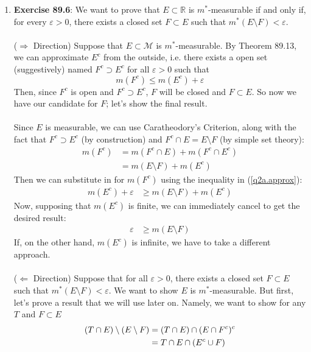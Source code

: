\documentclass[12pt]{article}
\theoremstyle{plain}
\theoremstyle{definition}
\theoremstyle{remark}
\begin{document}
\begin{enumerate}
\begin{enumerate}
\item \textbf{Exercise 89.6}: We want to prove that $E\subset \mathbb{R}$ is $m^*$-measurable if and only if, for every $\varepsilon>0$, there exists a closed set $F\subset E$ such that $m^*(E\setminus F)< \varepsilon$.
\\
\\
($\Rightarrow$ Direction) Suppose that $E\subset \mathscr{M}$ is $m^*$-measurable. By Theorem 89.13, we can approximate $E^c$ from the outside, i.e. there exists a open set (suggestively) named $F^c\supset E^c$ for all $\varepsilon>0$ such that
\begin{equation}
    \label{q2a.approx}
    m(F^c) \leq m(E^c) + \varepsilon 
\end{equation}
Then, since $F^c$ is open and $F^c\supset E^c$, $F$ will be closed and $F \subset E$. So now we have our candidate for $F$; let's show the final result.
\\
\\
Since $E$ is measurable, we can use Caratheodory's Criterion, along with the fact that $F^c \supset E^c$ (by construction) and $F^c \cap E = E\setminus F$ (by simple set theory):
\begin{align*}
    m(F^c) &= m(F^c \cap E) + m(F^c \cap E^c)\\
    &= m(E\setminus F) + m(E^c)
\end{align*}
Then we can substitute in for $m(F^c)$ using the inequality in (\ref{q2a.approx}):
\begin{align*}
    m(E^c) + \varepsilon &\geq m(E\setminus F) + m(E^c)
\end{align*}
Now, supposing that $m(E^c)$ is finite, we can immediately cancel to get the desired result:
\begin{align*}
    \varepsilon &\geq m(E\setminus F) 
\end{align*}
If, on the other hand, $m(E^c)$ is infinite, we have to take a different approach.
\\
\\
($\Leftarrow$ Direction) Suppose that for all $\varepsilon>0$, there exists a closed set $F\subset E$ such that $m^*(E\setminus F)<\varepsilon$. We want to show $E$ is $m^*$-measurable. But first, let's prove a result that we will use later on. Namely, we want to show for any $T$ and $F\subset E$
\begin{align}  
    (T\cap E) \setminus (E\setminus F) 
        &= (T\cap E) \cap (E \cap F^c)^c \notag\\
        &= T\cap E \cap (E^c \cup F) \notag\\

\end{align}
\end{enumerate}
\end{enumerate}
\end{document}
